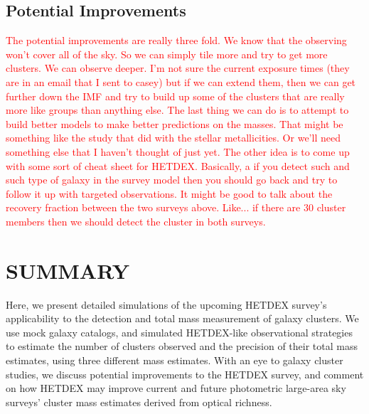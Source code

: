\documentclass[fleqn,usenatbib]{mnras}
\newcommand{\editorial}[1]{\textcolor{red}{#1}}
\begin{document}

\subsection{Potential Improvements}
\editorial{The potential improvements are really three fold. We know that the observing won't cover all of the sky. So we can simply tile more and try to get more clusters. We can observe deeper. I'm not sure the current exposure times (they are in an email that I sent to casey) but if we can extend them, then we can get further down the IMF and try to build up some of the clusters that are really more like groups than anything else. The last thing we can do is to attempt to  build better models to make better predictions on the masses. That might be something like the study that \cite{Acquaviva2016} did with the stellar metallicities. Or we'll need something else that I haven't thought of just yet. The other idea is to come up with some sort of cheat sheet for HETDEX. Basically, a if you detect such and such type of galaxy in the survey model then you should go back and try to follow it up with targeted observations. It might be good to talk about the recovery fraction between the two surveys above. Like... if there are 30 cluster members then we should detect the cluster in both surveys.}

\section{SUMMARY}\label{sec:summary}
Here, we present detailed simulations of the upcoming HETDEX survey's applicability to the detection and total mass measurement of galaxy clusters. We use mock galaxy catalogs, and simulated HETDEX-like observational strategies to estimate the number of clusters observed and the precision of their total mass estimates, using three different mass estimates. With an eye to galaxy cluster studies, we discuss potential improvements to the HETDEX survey, and comment on how HETDEX may improve current and future photometric large-area sky surveys' cluster mass estimates derived from optical richness.
\end{document}
